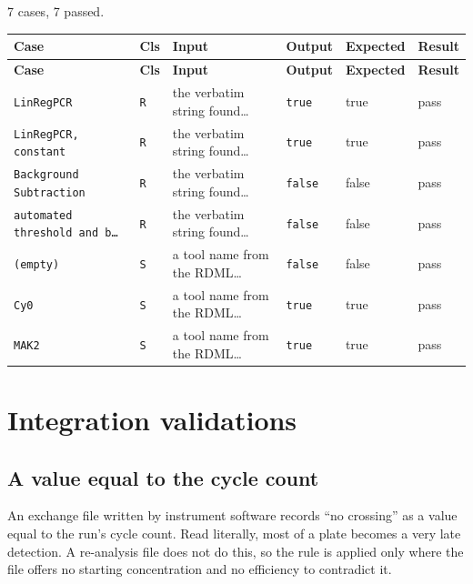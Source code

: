 \subsection*{}
{\small 7 cases, 7 passed.}\par
{\small
\begin{xltabular}{\linewidth}{|X|l|l|l|l|l|}
\toprule \textbf{Case} & \textbf{Cls} & \textbf{Input} & \textbf{Output} & \textbf{Expected} & \textbf{Result} \\\midrule\endfirsthead
\toprule \textbf{Case} & \textbf{Cls} & \textbf{Input} & \textbf{Output} & \textbf{Expected} & \textbf{Result} \\\midrule\endhead
\texttt{LinRegPCR} & \texttt{R} & the verbatim string found… & \texttt{true} & true & pass \\
\texttt{LinRegPCR, constant} & \texttt{R} & the verbatim string found… & \texttt{true} & true & pass \\
\texttt{Background Subtraction} & \texttt{R} & the verbatim string found… & \texttt{false} & false & pass \\
\texttt{automated threshold and b…} & \texttt{R} & the verbatim string found… & \texttt{false} & false & pass \\
\texttt{(empty)} & \texttt{S} & a tool name from the RDML… & \texttt{false} & false & pass \\
\texttt{Cy0} & \texttt{S} & a tool name from the RDML… & \texttt{true} & true & pass \\
\texttt{MAK2} & \texttt{S} & a tool name from the RDML… & \texttt{true} & true & pass \\
\bottomrule
\end{xltabular}}


\section{Integration validations}\label{sec:val-oracle}
\subsection*{A value equal to the cycle count}
An exchange file written by instrument software records ``no crossing'' as a value
equal to the run's cycle count. Read literally, most of a plate becomes a very late
detection. A re-analysis file does not do this, so the rule is applied only where
the file offers no starting concentration and no efficiency to contradict it.

